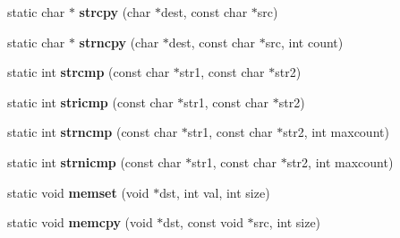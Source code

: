 \begin{DoxyCompactItemize}
\item 
static char $\ast$ {\bfseries strcpy} (char $\ast$dest, const char $\ast$src)\hypertarget{class_i_dream_sky_1_1_system_a3e63cd6d0d2e3e76cc7fc5a7876560d5}{}\label{class_i_dream_sky_1_1_system_a3e63cd6d0d2e3e76cc7fc5a7876560d5}

\item 
static char $\ast$ {\bfseries strncpy} (char $\ast$dest, const char $\ast$src, int count)\hypertarget{class_i_dream_sky_1_1_system_ad7b84bec292c7b5597817426c3960aa7}{}\label{class_i_dream_sky_1_1_system_ad7b84bec292c7b5597817426c3960aa7}

\item 
static int {\bfseries strcmp} (const char $\ast$str1, const char $\ast$str2)\hypertarget{class_i_dream_sky_1_1_system_a253795ed9d08fdd480e82cbb7c42bd21}{}\label{class_i_dream_sky_1_1_system_a253795ed9d08fdd480e82cbb7c42bd21}

\item 
static int {\bfseries stricmp} (const char $\ast$str1, const char $\ast$str2)\hypertarget{class_i_dream_sky_1_1_system_af2a9ec0778c2ec4f275fdbf589c941ac}{}\label{class_i_dream_sky_1_1_system_af2a9ec0778c2ec4f275fdbf589c941ac}

\item 
static int {\bfseries strncmp} (const char $\ast$str1, const char $\ast$str2, int maxcount)\hypertarget{class_i_dream_sky_1_1_system_a33cc1034ebfb3bff7bbe2a8964ce1d12}{}\label{class_i_dream_sky_1_1_system_a33cc1034ebfb3bff7bbe2a8964ce1d12}

\item 
static int {\bfseries strnicmp} (const char $\ast$str1, const char $\ast$str2, int maxcount)\hypertarget{class_i_dream_sky_1_1_system_af492a62687c5ee5b22f0b3998ae3ccef}{}\label{class_i_dream_sky_1_1_system_af492a62687c5ee5b22f0b3998ae3ccef}

\item 
static void {\bfseries memset} (void $\ast$dst, int val, int size)\hypertarget{class_i_dream_sky_1_1_system_a21d5c35e2d6339008b7ba8ac7f771153}{}\label{class_i_dream_sky_1_1_system_a21d5c35e2d6339008b7ba8ac7f771153}

\item 
static void {\bfseries memcpy} (void $\ast$dst, const void $\ast$src, int size)\hypertarget{class_i_dream_sky_1_1_system_ab15ca31db328a20ebdae3604b43273d0}{}\label{class_i_dream_sky_1_1_system_ab15ca31db328a20ebdae3604b43273d0}


\end{DoxyCompactItemize}
